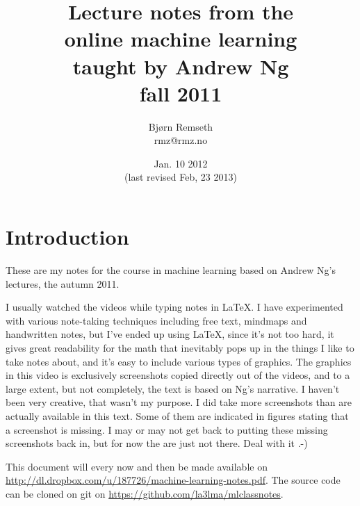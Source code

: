 \documentclass[a4, 12pt, english, USenglish]{scrreprt}
\begin{document}
\title{Lecture notes from the \\
online  machine learning\\
taught by Andrew Ng \\
fall 2011}

\author{Bj\o{}rn Remseth \\ rmz@rmz.no}

\date{Jan. 10 2012 \\ (last revised Feb, 23 2013)}
\maketitle
\tableofcontents



\begin{abstract}

\end{abstract}

\chapter*{Introduction}

These are my notes for the course in machine learning  based on Andrew
Ng's lectures, the autumn 2011.    

I usually watched the videos while typing notes in \LaTeX.  I have
experimented with various note-taking techniques including free text,
mindmaps and handwritten notes, but I've ended up using \LaTeX, since
it's not too hard, it gives great readability for the math that
inevitably pops up in the things I like to take notes about, and it's
easy to include various types of graphics.  The graphics in this video
is exclusively screenshots copied directly out of the videos, and to a
large extent, but not  completely, the text is based on Ng's
narrative.   I haven't been very creative, that wasn't my purpose.  I
did take more screenshots than are actually available in this text.
Some of them are indicated in figures stating that a screenshot is
missing.  I may or may not get back to putting these missing
screenshots back in, but for  now the are just not there.  Deal with
it .-)

This document will every now and then be made available on
\url{http://dl.dropbox.com/u/187726/machine-learning-notes.pdf}.   The
source code can be cloned on git on \url{https://github.com/la3lma/mlclassnotes}.
\end{document}
